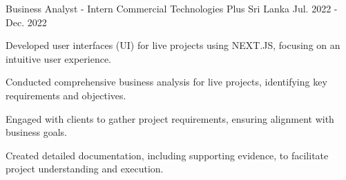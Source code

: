 \begin{cventries}
  \cventry
  {Business Analyst - Intern} %
  {Commercial Technologies Plus} %
  {Sri Lanka} %
  {Jul. 2022 - Dec. 2022} %
  {
    \begin{cvitems} %
      \item {Developed user interfaces (UI) for live projects using NEXT.JS, focusing on an intuitive user experience.}
      \item {Conducted comprehensive business analysis for live projects, identifying key requirements and objectives.}
      \item {Engaged with clients to gather project requirements, ensuring alignment with business goals.}
      \item {Created detailed documentation, including supporting evidence, to facilitate project understanding and execution.}
    \end{cvitems}
  }




\end{cventries}

